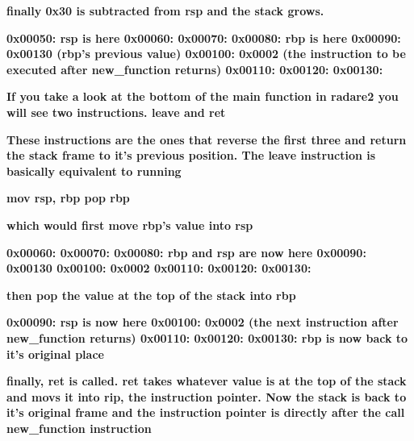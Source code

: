 \documentclass[letterpaper]{article}
\newcommand{\sitfig}[3]{
\begin{figure}[H]
\centering
\makebox[\textwidth][c]{
#2
}
\label{#1}
\end{figure}
}
\newcommand{\sitgfx}[4][scale=1.0]{
\sitfig{#3}{\texttt{[image: \#2]}}{#4}
}
\begin{document}
\textbf{finally 0x30 is subtracted from rsp and the stack grows.}

\textbf{0x00050: rsp is here\newline
0x00060:\newline
0x00070:\newline
0x00080: rbp is here\newline
0x00090: 0x00130 (rbp's previous value)\newline
0x00100: 0x0002 (the instruction to be executed after new\_function returns)\newline
0x00110:\newline
0x00120:\newline
0x00130:}

\textbf{If you take a look at the bottom of the main function in radare2 you will see two instructions. leave and ret}

  
\sitgfx[width=5.8335in,height=3.6457in]{FINALWORKINGDOCFORMERLYPRECURSOR-img089.png}{fig:unk}{TODO CAPTION}
 

\textbf{These instructions are the ones that reverse the first three and return the stack frame to it's previous
position. The leave instruction is basically equivalent to running}

\textbf{mov rsp, rbp\newline
pop rbp}

\textbf{which would first move rbp's value into rsp}

\textbf{0x00060:\newline
0x00070:\newline
0x00080: rbp and rsp are now here\newline
0x00090: 0x00130\newline
0x00100: 0x0002\newline
0x00110:\newline
0x00120:\newline
0x00130:}

\textbf{then pop the value at the top of the stack into rbp}

\textbf{0x00090: rsp is now here\newline
0x00100: 0x0002 (the next instruction after new\_function returns)\newline
0x00110:\newline
0x00120:\newline
0x00130: rbp is now back to it's original place}

\textbf{finally, ret is called. ret takes whatever value is at the top of the stack and movs it into rip, the
instruction pointer. Now the stack is back to it's original frame and the instruction pointer is directly after the
call new\_function instruction}
\end{document}

